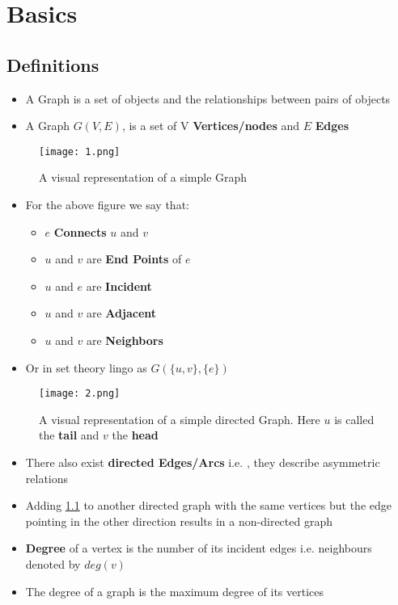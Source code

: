 \chapter{Basics}
\section{Definitions}
\begin{itemize}
\item A Graph is a set of objects and the relationships between pairs of objects
\item A Graph $G(V,E)$, is a set of V \textbf{Vertices/nodes} and $E$ \textbf{Edges}
\end{itemize}
\begin{figure}[h]
	\centering
\texttt{[image: 1.png]}
\caption{A visual representation of a simple Graph}
\end{figure}
\begin{itemize}
\item For the above figure we say that:
\begin{itemize}
\item $e$ \textbf{Connects} $u$ and $v$
\item $u$ and $v$ are \textbf{End Points} of $e$
\item $u$ and $e$ are \textbf{Incident}
\item $u$ and $v$ are \textbf{Adjacent}
\item $u$ and $v$ are \textbf{Neighbors}
\end{itemize}
\item Or in set theory lingo as $G(\{u,v\},\{e\})$
\end{itemize}
\begin{figure}[h]\label{fig_2}
	\centering
	\texttt{[image: 2.png]}
	\caption{A visual representation of a simple directed Graph. Here $u$ is called the \textbf{tail} and $v$ the \textbf{head}}
\end{figure}
\begin{itemize}
\item There also exist \textbf{directed Edges/Arcs} i.e. , they describe asymmetric relations
\item Adding \ref{fig_2} to another directed graph with the same vertices but the edge pointing in the other direction results in a non-directed graph
\item \textbf{Degree} of a vertex is the number of its incident edges i.e. neighbours denoted by $deg(v)$
\item The degree of a graph is the maximum degree of its vertices
\end{itemize}
